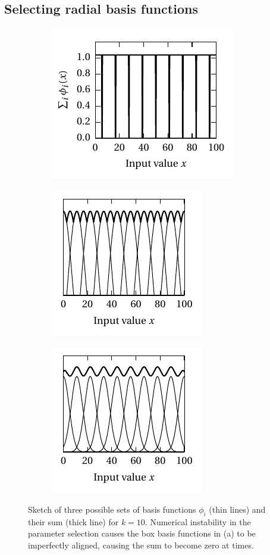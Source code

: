 \documentclass[a4paper,11pt]{article}
\begin{document}
\subsection{Selecting radial basis functions}

\begin{figure}
	\centering
	\begin{subfigure}{0.37\textwidth}%
		\centering%
		\includegraphics{media/basis_box.pdf}%
		\label{fig:basis_box}%
	\end{subfigure}%
	\begin{subfigure}{0.315\textwidth}%
		\centering%
		\includegraphics{media/basis_cosine.pdf}%
		\label{fig:basis_cosine}%
	\end{subfigure}%
	\begin{subfigure}{0.315\textwidth}%
		\centering%
		\includegraphics{media/basis_gaussian.pdf}%
		\label{fig:basis_gaussian}%
	\end{subfigure}%
	\caption{Sketch of three possible sets of basis functions $\phi_i$ (thin lines) and their sum (thick line) for $k = 10$. Numerical instability in the parameter selection causes the box basis functions in (a) to be imperfectly aligned, causing the sum to become zero at times.}
	\label{fig:basis}
\end{figure}
\end{document}
